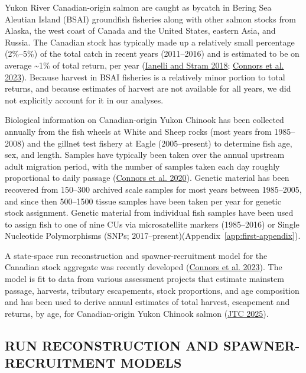 \documentclass[11pt]{book}
\begin{document}
Yukon River Canadian-origin salmon are caught as bycatch in Bering Sea Aleutian Island (BSAI) groundfish fisheries along with other salmon stocks from Alaska, the west coast of Canada and the United States, eastern Asia, and Russia. The Canadian stock has typically made up a relatively small percentage (2\%--5\%) of the total catch in recent years (2011--2016) and is estimated to be on average \textasciitilde1\% of total return, per year (\protect\hyperlink{ref-ianelli_chinook_2018}{Ianelli and Stram 2018}; \protect\hyperlink{ref-connors_estimates_2023}{Connors et al. 2023}). Because harvest in BSAI fisheries is a relatively minor portion to total returns, and because estimates of harvest are not available for all years, we did not explicitly account for it in our analyses.

Biological information on Canadian-origin Yukon Chinook has been collected annually from the fish wheels at White and Sheep rocks (most years from 1985--2008) and the gillnet test fishery at Eagle (2005--present) to determine fish age, sex, and length. Samples have typically been taken over the annual upstream adult migration period, with the number of samples taken each day roughly proportional to daily passage (\protect\hyperlink{ref-connors_incorporating_2020}{Connors et al. 2020}). Genetic material has been recovered from 150--300 archived scale samples for most years between 1985--2005, and since then 500--1500 tissue samples have been taken per year for genetic stock assignment. Genetic material from individual fish samples have been used to assign fish to one of nine CUs via microsatellite markers (1985--2016) or Single Nucleotide Polymorphisms (SNPs; 2017--present)(Appendix~\ref{app:first-appendix}).

A state-space run reconstruction and spawner-recruitment model for the Canadian stock aggregate was recently developed (\protect\hyperlink{ref-connors_estimates_2023}{Connors et al. 2023}). The model is fit to data from various assessment projects that estimate mainstem passage, harvests, tributary escapements, stock proportions, and age composition and has been used to derive annual estimates of total harvest, escapement and returns, by age, for Canadian-origin Yukon Chinook salmon (\protect\hyperlink{ref-JTC2025Report}{JTC 2025}).

\hypertarget{run-reconstruction-and-spawner-recruitment-models}{%
\subsection{RUN RECONSTRUCTION AND SPAWNER-RECRUITMENT MODELS}\label{run-reconstruction-and-spawner-recruitment-models}}
\end{document}
